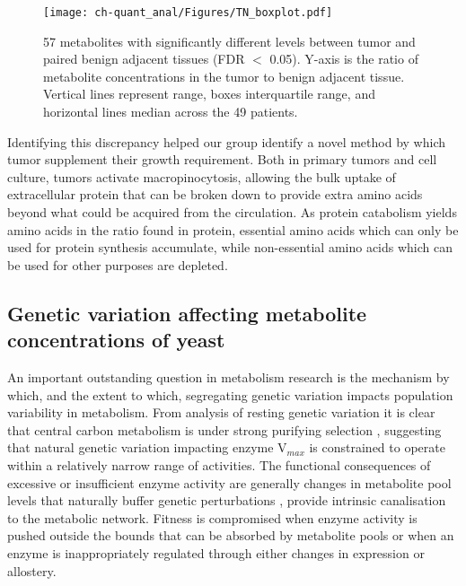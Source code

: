 \begin{figure}[h!]
\begin{center}
\texttt{[image: ch-quant\_anal/Figures/TN\_boxplot.pdf]}
\caption[Metabolites accumulated or depleted in pancreatic cancer]{57 metabolites with significantly different levels between tumor and paired benign adjacent tissues (FDR $<$ 0.05). Y-axis is the ratio of metabolite concentrations in the tumor to benign adjacent tissue. Vertical lines represent range, boxes interquartile range, and horizontal lines median across the 49 patients.}
\label{ch-quant_anal:tnboxplot}
\end{center}
\end{figure}

Identifying this discrepancy helped our group identify a novel method by which tumor supplement their growth requirement.  Both in primary tumors and cell culture, tumors activate macropinocytosis, allowing the bulk uptake of extracellular protein that can be broken down to provide extra amino acids beyond what could be acquired from the circulation. As protein catabolism yields amino acids in the ratio found in protein, essential amino acids which can only be used for protein synthesis accumulate, while non-essential amino acids which can be used for other purposes are depleted.  


\subsection{Genetic variation affecting metabolite concentrations of yeast}

An important outstanding question in metabolism research is the mechanism by which, and the extent to which, segregating genetic variation impacts population variability in metabolism.  From analysis of resting genetic variation it is clear that central carbon metabolism is under strong purifying selection \cite{Greenberg:2008uy}, suggesting that natural genetic variation impacting enzyme V$_{max}$ is constrained to operate within a relatively narrow range of activities. The functional consequences of excessive or insufficient enzyme activity are generally changes in metabolite pool levels that naturally buffer genetic perturbations \cite{Fendt:2010gr}, provide intrinsic canalisation to the metabolic network. Fitness is compromised when enzyme activity is pushed outside the bounds that can be absorbed by metabolite pools or when an enzyme is inappropriately regulated through either changes in expression or allostery. 

